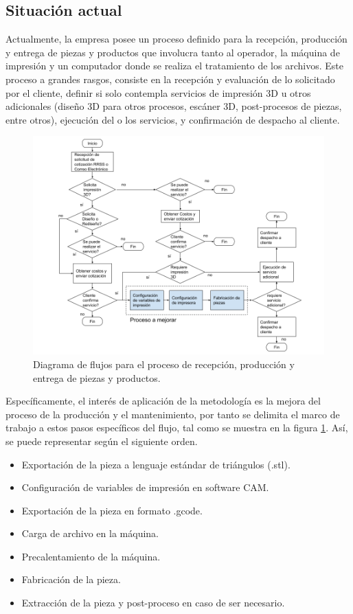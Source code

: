 \subsection{Situación actual}

Actualmente, la empresa posee un proceso definido para la recepción, producción y entrega de piezas y productos que involucra tanto al operador, la máquina de impresión y un computador donde se realiza el tratamiento de los archivos. Este proceso a grandes rasgos, consiste en la recepción y evaluación de lo solicitado por el cliente, definir si solo contempla servicios de impresión 3D u otros adicionales (diseño 3D para otros procesos, escáner 3D, post-procesos de piezas, entre otros), ejecución del o los servicios, y confirmación de despacho al cliente.  

\begin{figure}[H]
\centering
\includegraphics[scale=0.4]{images/procesosdiag.png}
\caption{Diagrama de flujos para el proceso de recepción, producción y entrega de piezas y productos.}
\label{procesosdiag}
\end{figure}


Específicamente, el interés de aplicación de la metodología es la mejora del proceso de la producción y el mantenimiento, por tanto se delimita el marco de trabajo a estos pasos específicos del flujo, tal como se muestra en la figura \ref{procesosdiag}. Así, se puede representar según el siguiente orden.

\begin{itemize}
\item Exportación de la pieza a lenguaje estándar de triángulos (.stl).
\item Configuración de variables de impresión en software CAM.
\item Exportación de la pieza en formato .gcode.
\item Carga de archivo en la máquina.
\item Precalentamiento de la máquina.
\item Fabricación de la pieza.
\item Extracción de la pieza y post-proceso en caso de ser necesario.
\end{itemize}

